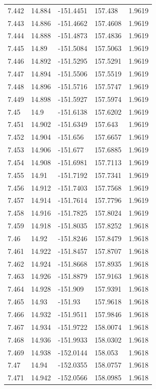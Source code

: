 \begin{tabular}{lllll}
7.442 & 14.884 & -151.4451 & 157.438 & 1.9619 \\
7.443 & 14.886 & -151.4662 & 157.4608 & 1.9619 \\
7.444 & 14.888 & -151.4873 & 157.4836 & 1.9619 \\
7.445 & 14.89 & -151.5084 & 157.5063 & 1.9619 \\
7.446 & 14.892 & -151.5295 & 157.5291 & 1.9619 \\
7.447 & 14.894 & -151.5506 & 157.5519 & 1.9619 \\
7.448 & 14.896 & -151.5716 & 157.5747 & 1.9619 \\
7.449 & 14.898 & -151.5927 & 157.5974 & 1.9619 \\
7.45 & 14.9 & -151.6138 & 157.6202 & 1.9619 \\
7.451 & 14.902 & -151.6349 & 157.643 & 1.9619 \\
7.452 & 14.904 & -151.656 & 157.6657 & 1.9619 \\
7.453 & 14.906 & -151.677 & 157.6885 & 1.9619 \\
7.454 & 14.908 & -151.6981 & 157.7113 & 1.9619 \\
7.455 & 14.91 & -151.7192 & 157.7341 & 1.9619 \\
7.456 & 14.912 & -151.7403 & 157.7568 & 1.9619 \\
7.457 & 14.914 & -151.7614 & 157.7796 & 1.9619 \\
7.458 & 14.916 & -151.7825 & 157.8024 & 1.9619 \\
7.459 & 14.918 & -151.8035 & 157.8252 & 1.9618 \\
7.46 & 14.92 & -151.8246 & 157.8479 & 1.9618 \\
7.461 & 14.922 & -151.8457 & 157.8707 & 1.9618 \\
7.462 & 14.924 & -151.8668 & 157.8935 & 1.9618 \\
7.463 & 14.926 & -151.8879 & 157.9163 & 1.9618 \\
7.464 & 14.928 & -151.909 & 157.9391 & 1.9618 \\
7.465 & 14.93 & -151.93 & 157.9618 & 1.9618 \\
7.466 & 14.932 & -151.9511 & 157.9846 & 1.9618 \\
7.467 & 14.934 & -151.9722 & 158.0074 & 1.9618 \\
7.468 & 14.936 & -151.9933 & 158.0302 & 1.9618 \\
7.469 & 14.938 & -152.0144 & 158.053 & 1.9618 \\
7.47 & 14.94 & -152.0355 & 158.0757 & 1.9618 \\
7.471 & 14.942 & -152.0566 & 158.0985 & 1.9618 \\

\end{tabular}
